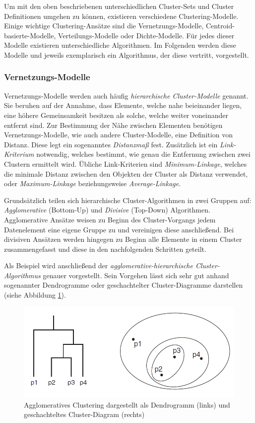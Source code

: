 Um mit den oben beschriebenen unterschiedlichen Cluster-Sets und Cluster Definitionen umgehen zu können,
existieren verschiedene Clustering-Modelle.
Einige wichtige Clustering-Ansätze sind die Vernetzungs-Modelle, Centroid-basierte-Modelle, Verteilungs-Modelle
oder Dichte-Modelle. Für jedes dieser Modelle existieren unterschiedliche Algorithmen. Im Folgenden werden
diese Modelle und jeweils exemplarisch ein Algorithmus, der diese vertritt, vorgestellt.

\subsubsection{Vernetzungs-Modelle}
\label{sec:grund_vernetzungs_clustering}

Vernetzungs-Modelle werden auch häufig \textit{hierarchische Cluster-Modelle} genannt. Sie beruhen auf
der Annahme, dass Elemente, welche nahe beieinander liegen, eine höhere Gemeinsamkeit besitzen als solche,
welche weiter voneinander entfernt sind. Zur Bestimmung der Nähe zwischen Elementen benötigen Vernetzungs-Modelle,
wie auch andere Cluster-Modelle, eine
Definition von Distanz. Diese legt ein sogenanntes \textit{Distanzmaß} fest. Zusätzlich ist ein \textit{Link-Kriterium} notwendig,
welches bestimmt, wie genau die Entfernung zwischen zwei Clustern ermittelt wird. Übliche Link-Kriterien
sind \textit{Minimum-Linkage}, welches die minimale Distanz zwischen den Objekten der Cluster als Distanz verwendet,
oder \textit{Maximum-Linkage} beziehungsweise \textit{Average-Linkage}. \cite[]{Jain1999, GeorgeSeif2018}


Grundsätzlich teilen sich hierarchische Cluster-Algorithmen in zwei Gruppen auf:
\textit{Agglomerative} (Bottom-Up) und \textit{Divisive} (Top-Down) Algorithmen.
Agglomerative Ansätze weisen zu Beginn des Cluster-Vorgangs jedem Datenelement eine eigene Gruppe zu und vereinigen
diese anschließend.
Bei divisiven Ansätzen werden hingegen zu Beginn alle Elemente in einem Cluster zusammengefasst und
diese in den nachfolgenden Schritten geteilt.

Als Beispiel wird anschließend der \textit{agglomerative-hierarchische Cluster-Algorithmus} genauer vorgestellt.
Sein Vorgehen lässt sich sehr gut anhand sogenannter Dendrogramme oder geschachtelter Cluster-Diagramme darstellen
(siehe Abbildung \ref{fig:grund_agglo_clustering}).

\begin{figure}[H]
    \centering
    \includegraphics[width=0.7\linewidth]{resources/img/grundlagen/agglo_clustering}
    \caption{Agglomeratives Clustering dargestellt als Dendrogramm (links) und geschachteltes Cluster-Diagram (rechts)}
    \label{fig:grund_agglo_clustering}
\end{figure}

